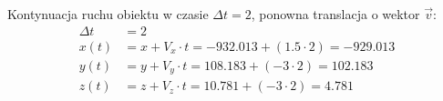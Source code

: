 \documentclass[a4paper]{article}
\begin{document}
Kontynuacja ruchu obiektu w czasie $\Delta t = 2 $, ponowna translacja o wektor $\vec{v}$:\\
\begin{align*}
\Delta t &= 2\\
x(t) &= x + V_x\cdot t = -932.013 + (1.5\cdot 2) = -929.013\\
y(t) &= y + V_y\cdot t = 108.183 + (-3 \cdot 2) = 102.183\\
z(t) &= z + V_z\cdot t = 10.781 + (-3 \cdot 2) = 4.781
\end{align*}
\end{document}
